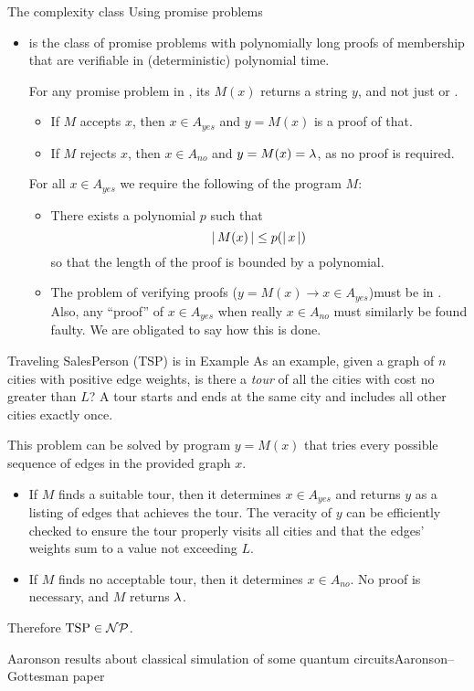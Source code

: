 \begin{frame}{The complexity class }{Using promise problems}

\begin{itemize}
    \item[\CompClass{NP}] is the class of promise problems with polynomially long proofs of membership that are verifiable in (deterministic) polynomial time.   
    
    For any promise problem in , its $M(x)$ returns a string $y$, and not just \True{} or \False{}.
    \begin{itemize}
        \item If $M$ accepts $x$, then $x\in A_{yes}$ and $y=M(x)$ is a proof of that.  
        \item If $M$ rejects $x$, then $x\in A_{no}$ and $y=M(x)=\lambda$, as no proof is required.
    \end{itemize}
    \MedSkip{}
    For all $x \in A_{yes}$ we require the following of the program $M$:
    \begin{itemize}
        \item There exists a polynomial $p$ such that \[|\,M(x)\,| \leq p(|\,x\,|)\]
        so that the length of the proof is bounded by a polynomial.
        \item  The problem of verifying proofs ($y=M(x)\rightarrow x\in A_{yes}$)must be in .  Also, any  ``proof'' of $x\in A_{yes}$ when really $x\in A_{no}$ must similarly be found faulty.
        We are obligated to say how this is done.
    \end{itemize}
    
\end{itemize}
\end{frame}
\begin{frame}{Traveling SalesPerson (TSP) is in }{Example}
As an example, given a graph of $n$ cities with positive edge weights, is there a \emph{tour} of all the cities with cost no greater than $L$?  A tour starts and ends at the same city and includes all other cities exactly once.

This problem can be solved by program $y=M(x)$ that tries every possible sequence of edges in the provided graph $x$.
\begin{itemize}
    \item If $M$ finds a suitable tour, then it determines $x\in A_{yes}$ and returns $y$ as a listing of edges that achieves the tour.  The veracity of $y$ can be efficiently checked to ensure the tour properly visits all cities and that the edges' weights sum to a value not exceeding $L$.
    \item If $M$ finds no acceptable tour, then it determines $x \in A_{no}$.  No proof is necessary, and $M$ returns $\lambda{}$.
\end{itemize}
Therefore $\mbox{TSP}\in \mathcal{NP}$.
    
\end{frame}

\begin{frame}{Aaronson results about classical simulation of some quantum circuits}{Aaronson--Gottesman paper}
    
\end{frame}